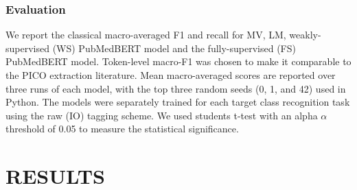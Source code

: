 \documentclass[10.7pt,]{article}
\begin{document}
\subsubsection{Evaluation}\label{eval}
%
We report the classical macro-averaged F1 and recall for MV, LM, weakly-supervised (WS) PubMedBERT model and the fully-supervised (FS) PubMedBERT model.
Token-level macro-F1 was chosen to make it comparable to the PICO extraction literature.
Mean macro-averaged scores are reported over three runs of each model, with the top three random seeds (0, 1, and 42) used in Python.
The models were separately trained for each target class recognition task using the raw (IO) tagging scheme.
We used students t-test with an alpha $\alpha$ threshold of 0.05 to measure the statistical significance.
%
\section{RESULTS}\label{results}
%
\end{document}
